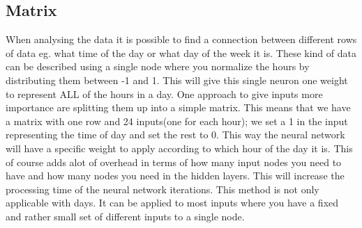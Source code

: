 \subsection{Matrix}
\label{sec:Matrix}
When analysing the data it is possible to find a connection between different rows of data eg. what time of the day or what day of the week it is. These kind of data can be described using a single node where you normalize the hours by distributing them between -1 and 1. This will give this single neuron one weight to represent ALL of the hours in a day. One approach to give inputs more importance are splitting them up into a simple matrix. This means that we have a matrix with one row and 24 inputs(one for each hour); we set a 1 in the input representing the time of day and set the rest to 0. This way the neural network will have a specific weight to apply according to which hour of the day it is. This of course adds alot of overhead in terms of how many input nodes you need to have and how many nodes you need in the hidden layers. This will increase the processing time of the neural network iterations. This method is not only applicable with days. It can be applied to most inputs where you have a fixed and rather small set of different inputs to a single node.

